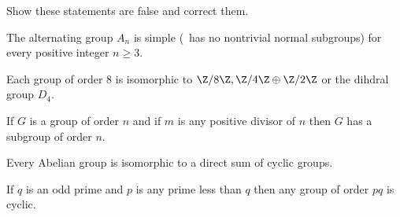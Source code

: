 Show these statements are false and correct them.
\begin{alist}
\item The alternating group $A_n$ is simple (\ie\ has no nontrivial
normal subgroups) for every positive integer $n\geq 3$.
\item Each group of order $8$ is isomorphic to $\Z/8\Z, \Z/4\Z\oplus
\Z/2\Z$ or the dihdral group $D_4$.
\item If $G$ is a group of order $n$ and if $m$ is any positive divisor
of $n$ then $G$ has a subgroup of order $n$.
\item Every Abelian group is isomorphic to a direct sum of cyclic
groups.
\item If $q$ is an odd prime and $p$ is any prime less than $q$ then
any group of order $pq$ is cyclic.
\end{alist}
